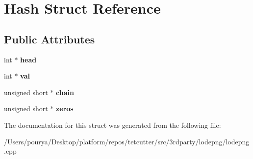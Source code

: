 \hypertarget{structHash}{}\section{Hash Struct Reference}
\label{structHash}
\subsection*{Public Attributes}
\begin{DoxyCompactItemize}
\item 
\hypertarget{structHash_a0977cf12b1d8e6bbc784b5e0877926f5}{}int $\ast$ {\bfseries head}\label{structHash_a0977cf12b1d8e6bbc784b5e0877926f5}

\item 
\hypertarget{structHash_a66918968854722efdf7ab5f8ac2c6c1d}{}int $\ast$ {\bfseries val}\label{structHash_a66918968854722efdf7ab5f8ac2c6c1d}

\item 
\hypertarget{structHash_abf6ad3db2f652a19cc4ff0792e477899}{}unsigned short $\ast$ {\bfseries chain}\label{structHash_abf6ad3db2f652a19cc4ff0792e477899}

\item 
\hypertarget{structHash_a7247caa3e23eaba8f0d199ec5010c931}{}unsigned short $\ast$ {\bfseries zeros}\label{structHash_a7247caa3e23eaba8f0d199ec5010c931}

\end{DoxyCompactItemize}


The documentation for this struct was generated from the following file\+:\begin{DoxyCompactItemize}
\item 
/\+Users/pourya/\+Desktop/platform/repos/tetcutter/src/3rdparty/lodepng/lodepng.\+cpp\end{DoxyCompactItemize}
